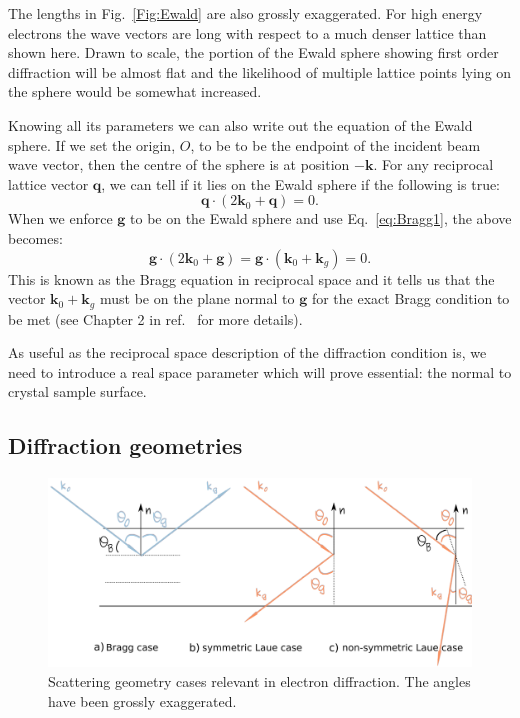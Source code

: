 The lengths in Fig.~\ref{Fig:Ewald} are also grossly exaggerated. For high energy electrons the wave vectors are long with respect to a much denser lattice than shown here. Drawn to scale, the portion of the Ewald sphere showing first order diffraction will be almost flat and the likelihood of multiple lattice points lying on the sphere would be somewhat increased.   



 Knowing all its parameters we can also write out the equation of the Ewald sphere. If we set the origin, $O$, to be to be the endpoint of the incident beam wave vector, then the centre of the sphere is at position $-\mathbf{k}$. For any reciprocal lattice vector $\mathbf{q}$, we can tell if it lies on the Ewald sphere if the following is true:
 \begin{equation*}
     \mathbf{q} \cdot (2 \mathbf{k}_0 + \mathbf{q})=0.
 \end{equation*}
When we enforce $\mathbf{g}$ to be on the Ewald sphere and use Eq.~\ref{eq:Bragg1}, the above becomes:
\begin{equation}
    \label{Eq:recBragg}
    \mathbf{g}\cdot (2 \mathbf{k}_0 + \mathbf{g})=\mathbf{g} \cdot (\mathbf{k}_0 + \mathbf{k}_g)=0.
\end{equation}
 This is known as the Bragg equation in reciprocal space and it tells us that the vector $\mathbf{k}_0 + \mathbf{k}_g$ must be on the plane normal to  $\mathbf{g}$ for the exact Bragg condition to be met (see Chapter 2 in  ref.~\cite{MarcTEM03} for more details). 
 




 




As useful as the reciprocal space description of the diffraction condition is, we need to introduce a real space parameter which will prove essential: the normal to crystal sample surface.

%
\subsection{Diffraction geometries}
\label{sec:diffracGeom}
\begin{figure}[ht]
    \centering
\includegraphics[width=0.92\linewidth]{Figures/BraggvsLaue.png}
\caption{Scattering geometry cases relevant in electron diffraction. The angles have been grossly exaggerated. }
\label{Fig:BraggvsLaue}
\end{figure}

